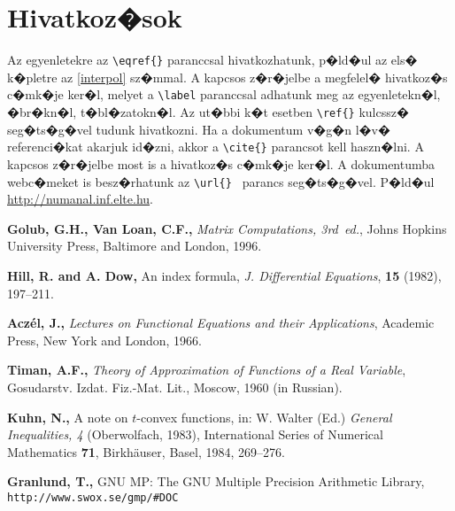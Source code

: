 \documentclass[oneside,11pt,a4paper]{article}
\begin{document}
\section{Hivatkoz�sok}
	Az egyenletekre az \texttt{\textbackslash eqref\{\}} paranccsal hivatkozhatunk, p�ld�ul az els� k�pletre az \eqref{interpol} sz�mmal. A kapcsos z�r�jelbe a megfelel� hivatkoz�s c�mk�je ker�l, melyet a \texttt{\textbackslash label} paranccsal adhatunk meg az egyenletekn�l, �br�kn�l, t�bl�zatokn�l. Az ut�bbi k�t esetben \texttt{\textbackslash ref\{\}} kulcssz� seg�ts�g�vel tudunk hivatkozni. Ha a dokumentum v�g�n l�v� referenci�kat akarjuk id�zni, akkor a \texttt{\textbackslash cite\{\}} parancsot kell haszn�lni. A kapcsos z�r�jelbe most is a hivatkoz�s c�mk�je ker�l. A dokumentumba webc�meket is besz�rhatunk az \texttt{\textbackslash url\{\} } parancs seg�ts�g�vel. P�ld�ul \url{http://numanal.inf.elte.hu}.\par



\begin{thebibliography}{9}

\textbf{Golub, G.H., Van Loan, C.F.,}
\textit{Matrix Computations, 3rd~ed.},
Johns Hopkins University Press, Baltimore and London, 1996.

\textbf{Hill, R. and A. Dow,}
An index formula,
\textit{J. Differential Equations}, \textbf{15} (1982), 197--211.

\textbf{Acz\'el, J.,}
\textit{Lectures on Functional Equations and their Applications},
Academic Press, New York and London, 1966.

\textbf{Timan, A.F.,}
\textit{Theory of Approximation of Functions of a Real Variable},
Gosudarstv. Izdat. Fiz.-Mat. Lit., Moscow, 1960 (in Russian).

\textbf{Kuhn, N.,}
A note on $t$-convex functions,
in: W. Walter (Ed.) \textit{General Inequalities, 4}  (Oberwolfach, 1983),
International Series of Numerical Mathematics \textbf{71},
Birkh\"auser, Basel, 1984, 269--276.

\textbf{Granlund, T.,} GNU MP: The GNU Multiple Precision Arithmetic Library,
{\tt http://www.swox.se/gmp/\#DOC}

\end{thebibliography}
\end{document}
